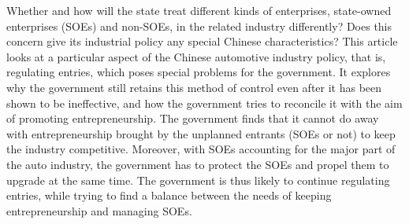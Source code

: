 Whether and how will the state treat different kinds of enterprises, state-owned enterprises (SOEs) and non-SOEs, in the related industry differently? Does this concern give its industrial policy any special Chinese characteristics? This article looks at a particular aspect of the Chinese automotive industry policy, that is, regulating entries, which poses special problems for the government. It explores why the government still retains this method of control even after it has been shown to be ineffective, and how the government tries to reconcile it with the aim of promoting entrepreneurship. The government finds that it cannot do away with entrepreneurship brought by the unplanned entrants (SOEs or not) to keep the industry competitive. Moreover, with SOEs accounting for the major part of the auto industry, the government has to protect the SOEs and propel them to upgrade at the same time. The government is thus likely to continue regulating entries, while trying to find a balance between the needs of keeping entrepreneurship and managing SOEs.
